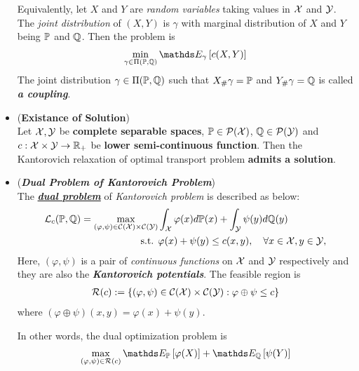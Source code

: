 \documentclass[11pt]{article}
\begin{document}
\begin{itemize}
\begin{definition}
Equivalently, let $X$ and $Y$ are \emph{random variables} taking values in ${\mathcal X}$ and ${\mathcal Y}$. The \emph{joint distribution} of $(X, Y)$ is $\gamma$ with marginal distribution of $X$ and $Y$ being ${\mathbb P}$ and ${\mathbb Q}$. Then the problem is
\begin{align*}
\min_{\gamma \in \Pi(\bP, \bQ)} \E{\gamma}{c(X, Y)}
\end{align*} The joint distribution $\gamma \in \Pi({\mathbb P}, {\mathbb Q})$ such that $X_{\#}\gamma = {\mathbb P}$ and $Y_{\#}\gamma = {\mathbb Q}$ is called \emph{\textbf{a coupling}}.
\end{definition}

\item \begin{proposition} (\textbf{Existance of Solution}) \citep{santambrogio2015optimal}\\
Let ${\mathcal X}, {\mathcal Y}$ be \textbf{complete separable spaces}, ${\mathbb P} \in {\mathcal P}({\mathcal X})$, ${\mathbb Q} \in {\mathcal P}({\mathcal Y})$ and $c: {\mathcal X} \times {\mathcal Y} \to {\mathbb R}_{+}$ be \textbf{lower semi-continuous function}. Then the Kantorovich relaxation of optimal transport problem \textbf{admits a solution}. 
\end{proposition}

\item \begin{definition} (\textbf{\emph{Dual Problem of Kantorovich Problem}}) \citep{villani2009optimal, santambrogio2015optimal, gabriel2019computational} \\
The \underline{\textbf{\emph{dual problem}}} of \emph{Kantorovich problem} is described as below:
\begin{align*}
{\mathcal L}_{c}({\mathbb P}, {\mathbb Q}) = \max_{(\varphi,  \psi) \in {\mathcal C}({\mathcal X})\times {\mathcal C}({\mathcal Y})} & \int_{{\mathcal X}}\varphi(x) d{\mathbb P}(x) + \int_{{\mathcal Y}}\psi(y) d{\mathbb Q}(y) \\
\text{s.t. }&  \varphi(x) + \psi(y) \le c(x, y),\quad \forall x\in {\mathcal X}, y \in {\mathcal Y}, 
\end{align*} Here, $(\varphi, \psi)$ is a pair of \emph{continuous functions} on ${\mathcal X}$ and ${\mathcal Y}$ respectively and they are also the \textbf{\emph{Kantorovich potentials}}. The feasible region is 
 \begin{align*}
{\mathcal R}(c) := \left\{(\varphi,  \psi) \in  {\mathcal C}({\mathcal X})\times {\mathcal C}({\mathcal Y}): \varphi \oplus \psi \le c\right\} 
\end{align*} where $( \varphi \oplus \psi)(x, y)=  \varphi(x) + \psi(y)$. 

In other words, the dual optimization problem is
\begin{align*}
\max_{(\varphi,  \psi) \in \cR(c)} \E{\bP}{\varphi(X)} + \E{\bQ}{\psi(Y)}
\end{align*}
\end{definition}


\end{itemize}
\end{document}
